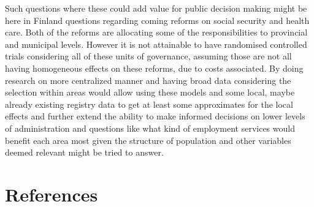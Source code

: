 \documentclass[main=english,12pt,a4paper,pdftex,econ,utf8]{aaltothesis}
\begin{document}
Such questions where these could add value for public decision making might be here in Finland questions regarding coming reforms on social security and health care. Both of the reforms are allocating some of the responsibilities to provincial and municipal levels. However it is not attainable to have randomised controlled trials considering all of these units of governance, assuming those are not all having homogeneous effects on these reforms, due to costs associated. By doing research on more centralized manner and having broad data considering the selection within areas would allow using these models and some local, maybe already existing registry data to get at least some approximates for the local effects and further extend the ability to make informed decisions on lower levels of administration and questions like what kind of employment services would benefit each area most given the structure of population and other variables deemed relevant might be tried to answer.

\clearpage

\section*{References}
\printbibliography[
    heading=subbibintoc,
    type=article,
    title={Articles \& seminar papers}
]
\printbibliography[
    heading=subbibintoc,
    type=book,
    title={Books}
]
\printbibliography[
    heading=subbibintoc,
    type=misc,
    title={Other sources}
]

\clearpage
\end{document}
